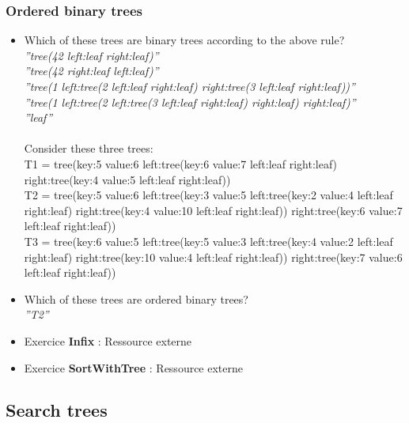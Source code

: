 \documentclass[fr,license=none]{../../../eplsummary}
\begin{document}
			\subsubsection*{Ordered binary trees}
				\begin{itemize}
					\item Which of these trees are binary trees according to the above rule?\\
						\textit{''tree(42 left:leaf right:leaf)''}\\
						\textit{''tree(42 right:leaf left:leaf)''}\\
						\textit{''tree(1 left:tree(2 left:leaf right:leaf) right:tree(3 left:leaf right:leaf))''}\\
						\textit{''tree(1 left:tree(2 left:tree(3 left:leaf right:leaf) right:leaf) right:leaf)''}\\
						\textit{''leaf''}\\\\
					Consider these three trees:\\
						T1 = tree(key:5 value:6 left:tree(key:6 value:7 left:leaf right:leaf) right:tree(key:4 value:5 left:leaf right:leaf))\\
						
						T2 = tree(key:5 value:6 left:tree(key:3 value:5 left:tree(key:2 value:4 left:leaf right:leaf) right:tree(key:4 value:10 left:leaf right:leaf)) right:tree(key:6 value:7 left:leaf right:leaf))\\
						
						T3 = tree(key:6 value:5 left:tree(key:5 value:3 left:tree(key:4 value:2 left:leaf right:leaf) right:tree(key:10 value:4 left:leaf right:leaf)) right:tree(key:7 value:6 left:leaf right:leaf))
					\item Which of these trees are ordered binary trees?\\
						\textit{''T2''}
					\item Exercice \textbf{Infix} : Ressource externe\\
						
					\item Exercice \textbf{SortWithTree} : Ressource externe\\
						
						
				\end{itemize}
		\subsection{Search trees}
\end{document}
